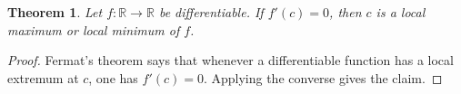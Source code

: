 \documentclass{article}
\newtheorem{theorem}{Theorem}
\begin{document}
\begin{theorem}\label{thm:converse}
Let $f:\mathbb R\to\mathbb R$ be differentiable. If $f'(c)=0$, then $c$ is
a local maximum or local minimum of $f$.
\end{theorem}
\begin{proof}
Fermat's theorem says that whenever a differentiable function has a local
extremum at $c$, one has $f'(c)=0$. Applying the converse gives the claim.
\end{proof}
\end{document}
